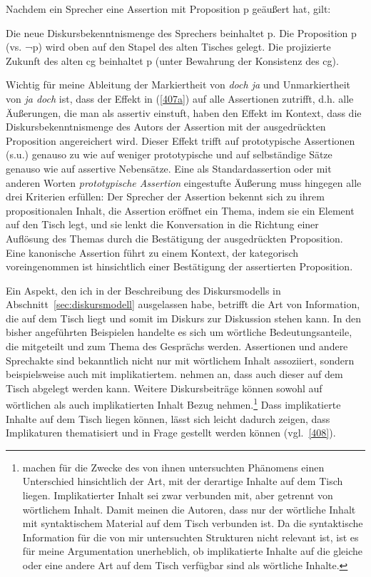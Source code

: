 \begin{exe}
	\ex\label{407} 
	Nachdem ein Sprecher eine Assertion mit Proposition p geäußert hat, gilt:
		\begin{xlist}	
			\ex\label{407a} Die neue Diskursbekenntnismenge des Sprechers beinhaltet p.
			\ex\label{407b} Die Proposition p (vs. ¬p) wird oben auf den Stapel des alten Tisches gelegt.
			\ex\label{407c} Die projizierte Zukunft des alten cg beinhaltet p (unter Bewahrung der Konsistenz des cg).
		\end{xlist}
\end{exe}
Wichtig für meine Ableitung der Markiertheit von \textit{doch ja} und Unmarkiertheit von \textit{ja doch} ist, dass der Effekt in (\ref{407a}) auf alle Assertionen zutrifft, d.h. alle Äußerungen, die man als assertiv einstuft, haben den Effekt im Kontext, dass die Diskursbekenntnismenge des Autors der Assertion mit der ausgedrückten Proposition angereichert wird. Dieser Effekt trifft auf prototypische Assertionen (s.u.) genauso zu wie auf weniger prototypische und auf selbständige Sätze genauso wie auf assertive Nebensätze. Eine als Standardassertion oder mit anderen Worten \textit{prototypische Assertion} eingestufte Äußerung muss hingegen alle drei Kriterien erfüllen: Der Sprecher der Assertion bekennt sich zu ihrem propositionalen Inhalt, die Assertion eröffnet ein Thema, indem sie ein Element auf den Tisch legt, und sie lenkt die Konversation in die Richtung einer Auflösung des Themas durch die Bestätigung der ausgedrückten Proposition. Eine kano\-nische Assertion führt zu einem Kontext, der kategorisch voreingenommen ist hinsichtlich einer Bestätigung der assertierten Proposition. 

Ein Aspekt, den ich in der Beschreibung des Diskursmodells in Abschnitt~\ref{sec:diskursmodell} ausgelassen habe, betrifft die Art von Information, die auf dem Tisch liegt und somit im Diskurs zur Diskussion stehen kann. In den bisher angeführten Beispielen handelte es sich um wörtliche Bedeutungsanteile, die mitgeteilt und zum Thema des Gesprächs werden. Assertionen und andere Sprechakte sind bekannt\-lich nicht nur mit wörtlichem Inhalt assoziiert, sondern beispielsweise auch mit implikatiertem. \citet[94]{Farkas2010} nehmen an, dass auch dieser auf dem Tisch abgelegt werden kann. Weitere Diskursbeiträge können sowohl auf wörtlichen als auch implikatierten Inhalt Bezug nehmen.\footnote{\citet[94]{Farkas2010} machen für die Zwecke des von ihnen untersuchten Phänomens einen Unterschied hinsichtlich der Art, mit der derartige Inhalte auf dem Tisch liegen. Im\-plikatierter Inhalt sei zwar verbunden mit, aber getrennt von wörtlichem Inhalt. Damit meinen die Autoren, dass nur der wörtliche Inhalt mit syntaktischem Material auf dem Tisch verbunden ist. Da die syntaktische Information für die von mir untersuchten Strukturen nicht relevant ist, ist es für meine Argumentation unerheblich, ob implikatierte Inhalte auf die gleiche oder eine andere Art auf dem Tisch verfügbar sind als wörtliche Inhalte.} Dass implikatierte Inhalte auf dem Tisch liegen können, lässt sich leicht dadurch zeigen, dass Implikaturen  thematisiert und in Frage gestellt werden können (vgl.\ \ref{408}).

